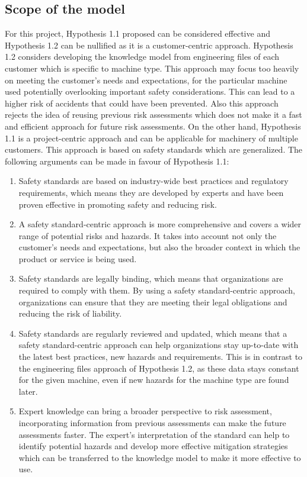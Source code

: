 \subsection{Scope of the model}
For this project, Hypothesis 1.1 proposed can be considered effective and Hypothesis 1.2 can be nullified as it is a customer-centric approach. Hypothesis 1.2 considers developing the knowledge model from engineering files of each customer which is specific to machine type. This approach may focus too heavily on meeting the customer's needs and expectations, for the particular machine used potentially overlooking important safety considerations. This can lead to a higher risk of accidents that could have been prevented. Also this approach rejects the idea of reusing previous risk assessments which does not make it a fast and efficient approach for future risk assessments. On the other hand, Hypothesis 1.1 is a project-centric approach and can be applicable for machinery of multiple customers. This approach is based on safety standards which are generalized. The following arguments can be made in favour of Hypothesis 1.1:
\begin{enumerate}
    \item Safety standards are based on industry-wide best practices and regulatory requirements, which means they are developed by experts and have been proven effective in promoting safety and reducing risk. 
    \item A safety standard-centric approach is more comprehensive and covers a wider range of potential risks and hazards. It takes into account not only the customer's needs and expectations, but also the broader context in which the product or service is being used.
    \item Safety standards are legally binding, which means that organizations are required to comply with them. By using a safety standard-centric approach, organizations can ensure that they are meeting their legal obligations and reducing the risk of liability.
    \item Safety standards are regularly reviewed and updated, which means that a safety standard-centric approach can help organizations stay up-to-date with the latest best practices, new hazards and requirements. This is in contrast to the engineering files approach of Hypothesis 1.2, as these data stays constant for the given machine, even if new hazards for the machine type are found later.
    \item Expert knowledge can bring a broader perspective to risk assessment, incorporating information from previous assessments can make the future assessments faster. The expert's interpretation of the standard can help to identify potential hazards and develop more effective mitigation strategies which can be transferred to the knowledge model to make it more effective to use.
\end{enumerate}

